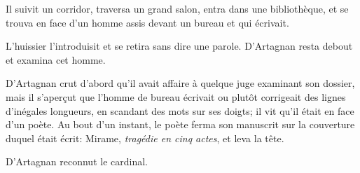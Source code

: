 Il suivit un corridor, traversa un grand salon, entra dans une bibliothèque, et se trouva en face d'un homme assis devant un bureau et qui écrivait. 

L'huissier l'introduisit et se retira sans dire une parole. D'Artagnan resta debout et examina cet homme. 

D'Artagnan crut d'abord qu'il avait affaire à quelque juge examinant son dossier, mais il s'aperçut que l'homme de bureau écrivait ou plutôt corrigeait des lignes d'inégales longueurs, en scandant des mots sur ses doigts; il vit qu'il était en face d'un poète. Au bout d'un instant, le poète ferma son manuscrit sur la couverture duquel était écrit: Mirame, \textit{tragédie en cinq actes}, et leva la tête. 

D'Artagnan reconnut le cardinal.
